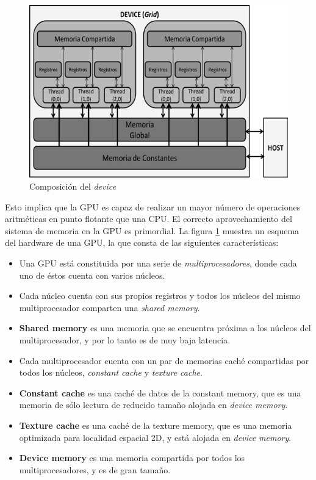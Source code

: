 \begin{figure}
\begin{center}
   \includegraphics[width=12cm]{fig/p.png}
\end{center}
\caption{\label{fig:device}Composición del \textit{device}}
\end{figure}

Esto implica que la GPU es capaz de realizar un mayor número de operaciones aritméticas en punto flotante que una CPU. El correcto aprovechamiento del sistema de memoria en la GPU es primordial. La figura \ref{fig:device} muestra un esquema del hardware de una GPU, la que consta de las siguientes características:

\begin{itemize}
	\item Una GPU está constituida por una serie de \textit{multiprocesadores}, donde cada uno de éstos cuenta con varios núcleos.

	\item Cada núcleo cuenta con sus propios registros y todos los núcleos del mismo multiprocesador comparten una \textit{shared memory}.

	\item \textbf{Shared memory} es una memoria que se encuentra próxima a los núcleos del multiprocesador, y por lo tanto es de muy baja latencia.
	
	\item Cada multiprocesador cuenta con un par de memorias caché compartidas por todos los núcleos, \textit{constant cache} y \textit{texture cache}.

	\item \textbf{Constant cache} es una caché de datos de la constant memory, que es una memoria de sólo lectura de reducido tamaño alojada en \textit{device memory}.

	\item \textbf{Texture cache} es una caché de la texture memory, que es una memoria optimizada para localidad espacial 2D, y está alojada en \textit{device memory}.

	\item \textbf{Device memory} es una memoria compartida por todos los multiprocesadores, y es de gran tamaño.

\end{itemize}



